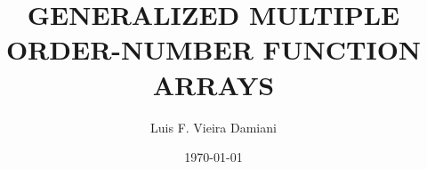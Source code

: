 \documentclass{beamer}
\title[Thesis Proposal]{GENERALIZED MULTIPLE ORDER-NUMBER FUNCTION ARRAYS}
\author{Luis F. Vieira Damiani}
\institute[UF]{University of Florida\\
\medskip
\textit{damiani@ufl.edu}}
\date{\today}
\begin{document}
\begin{frame}
\titlepage
\end{frame}











%
\end{document}
